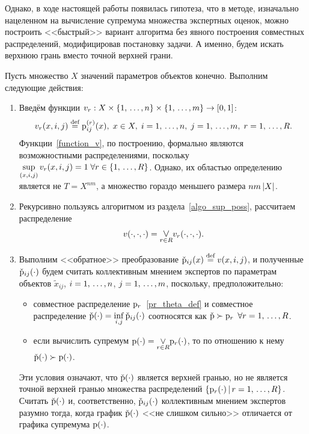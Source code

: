 Однако, в ходе настоящей работы появилась гипотеза, что в методе, изначально нацеленном на  вычисление супремума множества экспертных оценок, можно построить <<быстрый>> вариант алгоритма без явного построения совместных распределений, модифицировав постановку задачи. А именно, будем искать верхнюю грань вместо точной верхней грани. %

Пусть множество $X$ значений параметров объектов конечно. Выполним следующие действия:
\begin{enumerate}
	\item Введём функции $v_r: X \times \{1,\, \ldots, n\} \times \{1,\, \ldots, m\} \rightarrow [0,1]$:
		  \begin{equation}
		      \label{function_v}
		      v_r(x, i, j) \overset{\text{def}}{=} {\mathrm{p}}_{ij}^{(r)}(x),\; x \in X, \; i = 1,\, \ldots, n,\; j = 1,\, \ldots, m,\; r = 1,\, \ldots, R.
		  \end{equation}
		  Функции~\eqref{function_v}, по построению, формально являются возможностными распределениями, поскольку $  \underset{(x,i,j)} \sup \,v_r(x,i,j) = 1\; \forall r \in \{1,\, \ldots, R\}$. Однако, их областью определению является не $T = X^{nm}$, а множество гораздо меньшего размера $nm\left| X \right|$.
	\item Рекурсивно пользуясь алгоритмом из раздела~\ref{algo_sup_poss}, рассчитаем распределение 
	\begin{equation*}	
	      v(\cdot,\cdot,\cdot) = \underset{r \in R} {\mathlarger \vee}  v_r(\cdot,\cdot,\cdot).
	\end{equation*}	
	\item Выполним <<обратное>> преобразование $\check{{\mathrm{p}}}_{ij}(x) \overset{\text{def}}{=} v(x, i,j)$, и полученные $\check{{\mathrm{p}}}_{ij}(\cdot)$ будем  считать коллективным мнением экспертов по параметрам объектов $\tilde x_{ij}$, $i = 1,\, \ldots, n$, $j = 1,\, \ldots, m$, поскольку, предположительно: 
	\begin{itemize}
	    \item
	    совместное распределение ${\mathrm{p}}_r$~\eqref{pr_theta_def} %
	    и совместное распределение $\check{{\mathrm{p}}}(\cdot) = \underset{i,j}\inf\, \check{{\mathrm{p}}}_{ij}(\cdot)$ соотносятся как $\check{{\mathrm{p}}} \succ {\mathrm{p}}_r$  $\forall r = 1,\, \ldots, R$. 
	    \item если вычислить супремум $\p(\cdot) = \underset{r \in R} {\mathlarger \vee}  \p_r(\cdot)$, то по отношению к нему $\check{{\mathrm{p}}}(\cdot) \succ {\mathrm{p}}(\cdot)$.  
	\end{itemize}
	Эти условия означают, что $\check{{\mathrm{p}}}(\cdot)$ является верхней гранью, но не является точной верхней гранью множества распределений $\{{\mathrm{p}}_r(\cdot) \,|\, r = 1,\, \ldots, R \}$. Считать $\check{{\mathrm{p}}}(\cdot)$ и, соответственно, $\check{{\mathrm{p}}}_{ij}(\cdot)$ коллективным мнением экспертов разумно тогда, когда график $\check{{\mathrm{p}}}(\cdot)$ <<не слишком сильно>> отличается от графика супремума ${\mathrm{p}}(\cdot)$.
\end{enumerate}	

